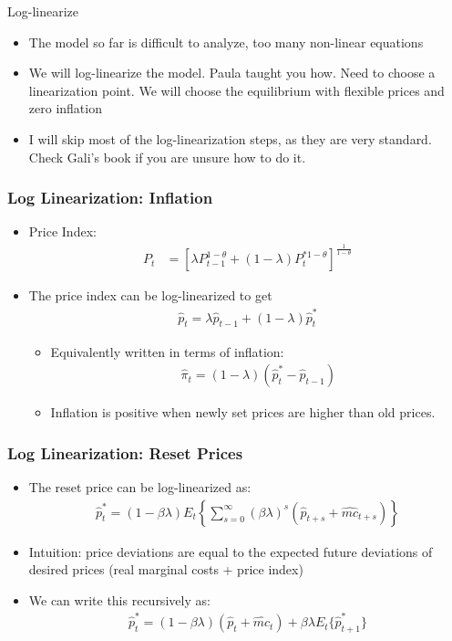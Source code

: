 \documentclass[11pt,aspectratio=169,xcolor={dvipsnames},hyperref={pdftex,pdfpagemode=UseNone,hidelinks,pdfdisplaydoctitle=true},usepdftitle=false]{beamer}
\begin{document}
\begin{frame}{Log-linearize}
\begin{itemize}
\item The model so far is difficult to analyze, too many non-linear equations
\pause
\item We will log-linearize the model. Paula taught you how. Need to choose a linearization point. We will choose the equilibrium with flexible prices and zero inflation
\pause
\item I will skip most of the log-linearization steps, as they are very standard. Check Gali's book if you are unsure how to do it.
\end{itemize}
\end{frame}



\begin{frame}
\frametitle{Log Linearization: Inflation
}
\begin{itemize}
	\item Price Index:
	\begin{align*}
		P_t&=\left[\lambda P_{t-1}^{1-\theta} + (1-\lambda) P_{t}^{*1-\theta}\right]^{\frac{1}{1-\theta}} 
	\end{align*}
	\pause
	\item The price index can be log-linearized to get
	\begin{align*}
		\hat{p}_t=\lambda \hat{p}_{t-1}+(1-\lambda)\hat{p}_t^*
	\end{align*}
	\pause
	\begin{itemize}
		\item Equivalently written in terms of inflation:
		\begin{align*}
		\hat{\pi}_t=(1-\lambda)(\hat{p}_t^*-\hat{p}_{t-1})
	\end{align*}
	\item Inflation is positive when newly set prices are higher than old prices.
	\end{itemize}
\end{itemize}
\end{frame}


\begin{frame}
\frametitle{Log Linearization: Reset Prices
}
\begin{itemize}
	\item The reset price can be log-linearized as:
	\begin{align*}
		\hat{p}_t^*=(1-\beta\lambda)E_t\left\{\sum_{s=0}^{\infty}(\beta\lambda)^s\left(\hat{p}_{t+s}+\hat{mc}_{t+s}\right)\right\} 
	\end{align*}
	\item Intuition: price deviations are equal to the expected future deviations of desired prices (real marginal costs + price index)
	\pause
	\item We can write this recursively as:
	\begin{align*}
		\hat{p}_t^*=(1-\beta\lambda)(\hat{p}_{t}+\hat{mc}_{t})+\beta\lambda E_t\{\hat{p}_{t+1}^*\}
	\end{align*}
\end{itemize}
\end{frame}
\end{document}
